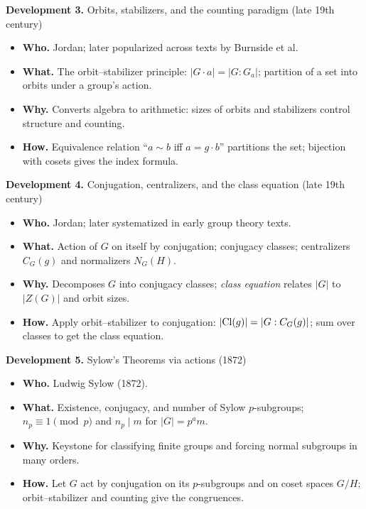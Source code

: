 \documentclass[12pt]{article}
\theoremstyle{definition}
\begin{document}
\newpage

\textbf{Development 3.} Orbits, stabilizers, and the counting paradigm (late 19th century)

\newpage

\begin{itemize}
  \item \textbf{Who.} Jordan; later popularized across texts by Burnside et al.
  \item \textbf{What.} The orbit–stabilizer principle: $|G\cdot a| = |G:G_a|$; partition of a set into orbits under a group’s action.
  \item \textbf{Why.} Converts algebra to arithmetic: sizes of orbits and stabilizers control structure and counting.
  \item \textbf{How.} Equivalence relation “$a \sim b$ iff $a=g\cdot b$” partitions the set; bijection with cosets gives the index formula.
\end{itemize}

\newpage

\textbf{Development 4.} Conjugation, centralizers, and the class equation (late 19th century)

\newpage

\begin{itemize}
  \item \textbf{Who.} Jordan; later systematized in early group theory texts.
  \item \textbf{What.} Action of $G$ on itself by conjugation; conjugacy classes; centralizers $C_G(g)$ and normalizers $N_G(H)$.
  \item \textbf{Why.} Decomposes $G$ into conjugacy classes; \emph{class equation} relates $|G|$ to $|Z(G)|$ and orbit sizes.
  \item \textbf{How.} Apply orbit–stabilizer to conjugation: $|{\rm Cl}(g)|=|G:C_G(g)|$; sum over classes to get the class equation.
\end{itemize}

\newpage

\textbf{Development 5.} Sylow’s Theorems via actions (1872)

\newpage

\begin{itemize}
  \item \textbf{Who.} Ludwig Sylow (1872).
  \item \textbf{What.} Existence, conjugacy, and number of Sylow $p$-subgroups; $n_p \equiv 1 \pmod p$ and $n_p \mid m$ for $|G|=p^a m$.
  \item \textbf{Why.} Keystone for classifying finite groups and forcing normal subgroups in many orders.
  \item \textbf{How.} Let $G$ act by conjugation on its $p$-subgroups and on coset spaces $G/H$; orbit–stabilizer and counting give the congruences.
\end{itemize}
\end{document}
